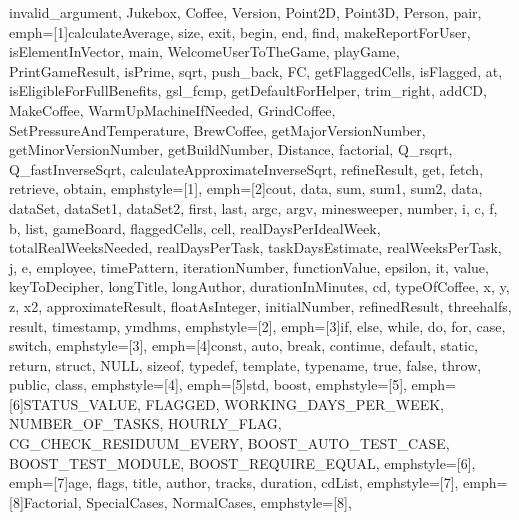 {{              invalid_argument, Jukebox, Coffee, Version, Point2D, Point3D, Person, pair},
emph=[1]{calculateAverage, size, exit, begin, end, find, makeReportForUser, isElementInVector,
         main, WelcomeUserToTheGame, playGame, PrintGameResult, isPrime, sqrt, push_back, FC,
         getFlaggedCells, isFlagged, at, isEligibleForFullBenefits, gsl_fcmp, getDefaultForHelper,
         trim_right, addCD, MakeCoffee, WarmUpMachineIfNeeded, GrindCoffee, SetPressureAndTemperature,
         BrewCoffee, getMajorVersionNumber, getMinorVersionNumber, getBuildNumber, Distance, factorial,
         Q_rsqrt, Q_fastInverseSqrt, calculateApproximateInverseSqrt, refineResult, get, fetch, retrieve, obtain},
emphstyle=[1]{\color{NavyBlue}}, %
emph=[2]{cout, data, sum, sum1, sum2, data, dataSet, dataSet1, dataSet2, first, last, argc, argv, minesweeper,
         number, i, c, f, b, list, gameBoard, flaggedCells, cell, realDaysPerIdealWeek, totalRealWeeksNeeded,
         realDaysPerTask, taskDaysEstimate, realWeeksPerTask, j, e, employee, timePattern, iterationNumber,
         functionValue, epsilon, it, value, keyToDecipher, longTitle, longAuthor, durationInMinutes, cd,
         typeOfCoffee, x, y, z, x2, approximateResult, floatAsInteger, initialNumber, refinedResult,
         threehalfs, result, timestamp, ymdhms},
emphstyle=[2]{\color{Orange}}, %
emph=[3]{if, else, while, do, for, case, switch},
emphstyle=[3]{\color{violet}}, %
emph=[4]{const, auto, break, continue, default, static, return, struct, NULL, sizeof, typedef,
         template, typename, true, false, throw, public, class},
emphstyle=[4]{\color{ProcessBlue}}, %
emph=[5]{std, boost},
emphstyle=[5]{\color{Maroon}}, %
emph=[6]{STATUS_VALUE, FLAGGED, WORKING_DAYS_PER_WEEK, NUMBER_OF_TASKS, HOURLY_FLAG,
         CG_CHECK_RESIDUUM_EVERY, BOOST_AUTO_TEST_CASE, BOOST_TEST_MODULE, BOOST_REQUIRE_EQUAL},
emphstyle=[6]{\color{Gray}}, %
emph=[7]{age, flags, title, author, tracks, duration, cdList},
emphstyle=[7]{\color{Peach!50!Purple}}, %
emph=[8]{Factorial, SpecialCases, NormalCases},
emphstyle=[8]{\color{Blue}}, %
}


\def\CPP{\lstinline[style=MyCpp, basicstyle=\ttfamily\color{black}]}

\makeatletter
\newenvironment{CenteredBox}{%
\begin{Sbox}}{%
\end{Sbox}\centerline{\parbox{\wd\@Sbox}{\TheSbox}}}%
\makeatother


